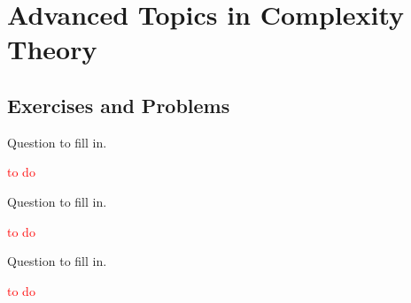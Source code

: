 \chapter{Advanced Topics in Complexity Theory}

\section*{Exercises and Problems}

\setcounter{exercise}{18}

\begin{exercise}
  Question to fill in.
\end{exercise}

\textcolor{red}{to do}

\begin{exercise}
  Question to fill in.
\end{exercise}

\textcolor{red}{to do}

\begin{exercise}
  Question to fill in.
\end{exercise}

\textcolor{red}{to do}
